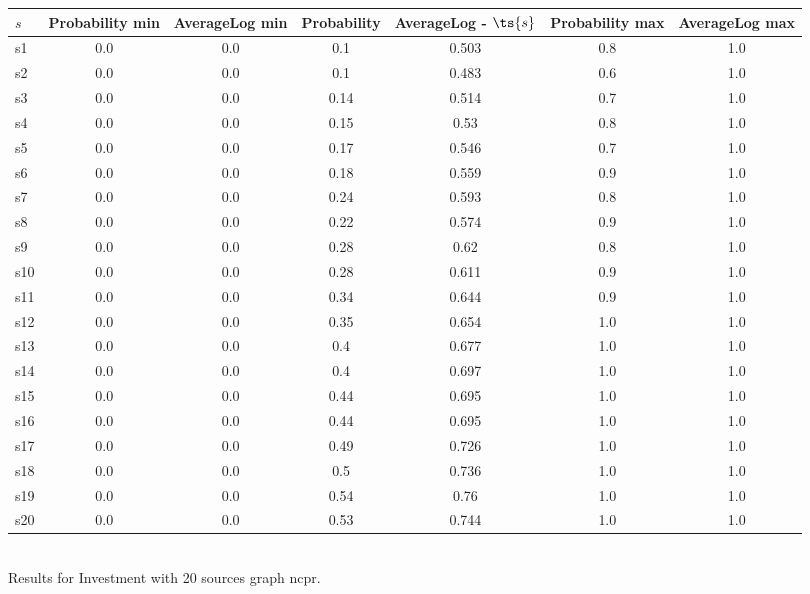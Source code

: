 \documentclass{article}
\begin{document}
\noindent\begin{tabular}{|l|c|c|c|c|c|c|}
\hline
$s$& Probability min & AverageLog min & Probability & AverageLog - $\ts{s}$ & Probability max & AverageLog max\\
\hline
s1 &0.0 & 0.0 & 0.1 & 0.503 & 0.8 & 1.0\\
\hline
s2 &0.0 & 0.0 & 0.1 & 0.483 & 0.6 & 1.0\\
\hline
s3 &0.0 & 0.0 & 0.14 & 0.514 & 0.7 & 1.0\\
\hline
s4 &0.0 & 0.0 & 0.15 & 0.53 & 0.8 & 1.0\\
\hline
s5 &0.0 & 0.0 & 0.17 & 0.546 & 0.7 & 1.0\\
\hline
s6 &0.0 & 0.0 & 0.18 & 0.559 & 0.9 & 1.0\\
\hline
s7 &0.0 & 0.0 & 0.24 & 0.593 & 0.8 & 1.0\\
\hline
s8 &0.0 & 0.0 & 0.22 & 0.574 & 0.9 & 1.0\\
\hline
s9 &0.0 & 0.0 & 0.28 & 0.62 & 0.8 & 1.0\\
\hline
s10 &0.0 & 0.0 & 0.28 & 0.611 & 0.9 & 1.0\\
\hline
s11 &0.0 & 0.0 & 0.34 & 0.644 & 0.9 & 1.0\\
\hline
s12 &0.0 & 0.0 & 0.35 & 0.654 & 1.0 & 1.0\\
\hline
s13 &0.0 & 0.0 & 0.4 & 0.677 & 1.0 & 1.0\\
\hline
s14 &0.0 & 0.0 & 0.4 & 0.697 & 1.0 & 1.0\\
\hline
s15 &0.0 & 0.0 & 0.44 & 0.695 & 1.0 & 1.0\\
\hline
s16 &0.0 & 0.0 & 0.44 & 0.695 & 1.0 & 1.0\\
\hline
s17 &0.0 & 0.0 & 0.49 & 0.726 & 1.0 & 1.0\\
\hline
s18 &0.0 & 0.0 & 0.5 & 0.736 & 1.0 & 1.0\\
\hline
s19 &0.0 & 0.0 & 0.54 & 0.76 & 1.0 & 1.0\\
\hline
s20 &0.0 & 0.0 & 0.53 & 0.744 & 1.0 & 1.0\\
\hline
\end{tabular}\\

\noindent Results for Investment with 20 sources graph ncpr.
\end{document}
